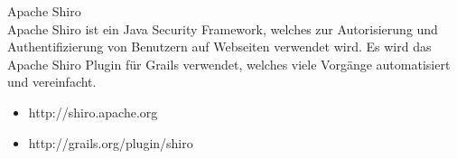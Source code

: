 Apache Shiro\\
Apache Shiro ist ein Java Security Framework, welches zur Autorisierung und Authentifizierung von Benutzern auf Webseiten verwendet wird. Es wird das Apache Shiro Plugin für Grails verwendet, welches viele Vorgänge automatisiert und vereinfacht.\\
\begin{itemize}
\item http://shiro.apache.org\\
\item http://grails.org/plugin/shiro\\
\end{itemize}\\
